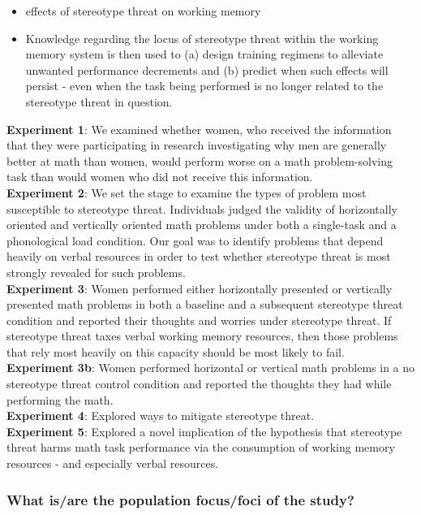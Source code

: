 \documentclass[
  doc, a4paper]{apa7}
\providecommand{\tightlist}{%
  \setlength{\itemsep}{0pt}\setlength{\parskip}{0pt}}
\begin{document}
\begin{itemize}
\tightlist
\item
  effects of stereotype threat on working memory
\item
  Knowledge regarding the locus of stereotype threat within the working memory system is then used to (a) design training regimens to alleviate unwanted performance decrements and (b) predict when such effects will persist - even when the task being performed is no longer related to the stereotype threat in question.
\end{itemize}

\textbf{Experiment 1}: We examined whether women, who received the information that they were participating in research investigating why men are generally better at math than women, would perform worse on a math problem-solving task than would women who did not receive this information.\\
\textbf{Experiment 2}: We set the stage to examine the types of problem most susceptible to stereotype threat. Individuals judged the validity of horizontally oriented and vertically oriented math problems under both a single-task and a phonological load condition. Our goal was to identify problems that depend heavily on verbal resources in order to test whether stereotype threat is most strongly revealed for such problems.\\
\textbf{Experiment 3}: Women performed either horizontally presented or vertically presented math problems in both a baseline and a subsequent stereotype threat condition and reported their thoughts and worries under stereotype threat. If stereotype threat taxes verbal working memory resources, then those problems that rely most heavily on this capacity should be most likely to fail.\\
\textbf{Experiment 3b}: Women performed horizontal or vertical math problems in a no stereotype threat control condition and reported the thoughts they had while performing the math.\\
\textbf{Experiment 4}: Explored ways to mitigate stereotype threat.\\
\textbf{Experiment 5}: Explored a novel implication of the hypothesis that stereotype threat harms math task performance via the consumption of working memory resources - and especially verbal resources.

\subsubsection{What is/are the population focus/foci of the study?}\label{what-isare-the-population-focusfoci-of-the-study}
\end{document}
